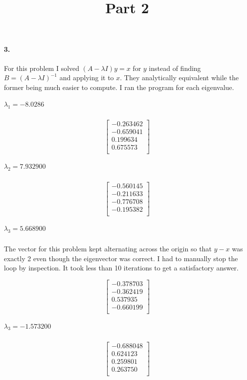 \documentclass[12pt]{article}
\begin{document}
\newpage
\paragraph{3.}
	 For this problem I solved $(A - \lambda I)y = x$ for $y$ instead of finding $B = (A-\lambda I)^{-1}$ and applying it to $x$. They analytically equivalent while the former being much easier to compute. I ran the program for each eigenvalue. 

	 \subparagraph{$\lambda_1 = -8.0286$}
	 \[
	 \begin{bmatrix}
	 -0.263462 \\
	 -0.659041 \\
	 0.199634  \\
	 0.675573  \\
	 \end{bmatrix}
	 \]
	 
	 \subparagraph{$\lambda_2 = 7.932900$}
	 \[
	 \begin{bmatrix}
	 -0.560145 \\
	 -0.211633 \\
	 -0.776708 \\
	 -0.195382 \\
	 \end{bmatrix}
	 \]
	 
	 \subparagraph{$\lambda_3 = 5.668900$}
	 The vector for this problem kept alternating across the origin so that $y-x$ was exactly 2 even though the eigenvector was correct. I had to manually stop the loop by inspection. It took less than 10 iterations to get a satisfactory answer.
	 	
	 \[
	 \begin{bmatrix}
	 -0.378703 \\
	 -0.362419 \\
	 0.537935  \\
	 -0.660199 \\
	 \end{bmatrix}
	 \]
	 
	 \subparagraph{$\lambda_3 = -1.573200$}
	 \[
	 \begin{bmatrix}
	 -0.688048 \\
	 0.624123  \\
	 0.259801  \\
	 0.263750  \\
	 \end{bmatrix}
	 \]
	
	
\newpage	
\title{\textbf{Part 2}}
\end{document}
